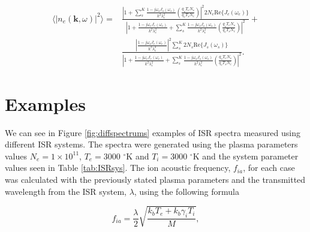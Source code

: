 \begin{equation}
\label{eq:sumspeceqactual}
\begin{split}
\displaystyle \langle \left|n_e(\mathbf{k},\omega)\right|^2\rangle =&  \frac{\left|1 + \sum_s^K  \frac{1-j\omega_s J_s(\omega_s)}{k^2\lambda_e^2} \left(\frac{q_sT_eN_s}{q_eT_sN_e}\right) \right|^2 2N_e\text{Re}\{J_e(\omega_e)\}}{\left|1 + \frac{1-j\omega_e J_e(\omega_e)}{k^2\lambda_e^2}  +\sum_s^K  \frac{1-j\omega_s J_s(\omega_s)}{k^2\lambda_e^2} \left(\frac{q_sT_eN_s}{q_eT_sN_e}\right) \right|^2}       + \\        & \frac{\left| \frac{1-j\omega_s J_e(\omega_e)}{k^2\lambda_e^2} \right|^2\sum_s^K  2N_s\text{Re}\{J_s(\omega_s)\}}{\left|1 + \frac{1-j\omega_e J_e(\omega_e)}{k^2\lambda_e^2}  +\sum_s^K  \frac{1-j\omega_s J_s(\omega_s)}{k^2\lambda_e^2} \left(\frac{q_sT_eN_s}{q_eT_sN_e}\right) \right|^2}.
\end{split}
\end{equation}

\section{Examples}
We can see in Figure \ref{fig:diffspectrums} examples of ISR spectra measured using different ISR systems. The spectra were generated using the plasma parameters values $N_e=1\times10^{11}$, $T_e=$3000 $^\circ$K and $T_i=$3000 $^\circ$K and the system parameter values seen in Table \ref{tab:ISRsys}. The ion acoustic frequency, $f_{ia}$, for each case was calculated with the previously stated plasma parameters  and the transmitted wavelength from the ISR system, $\lambda$, using the following formula

\begin{equation}
\label{eq:iaf}
f_{ia} = \frac{\lambda}{2}\sqrt{\frac{k_bT_e +k_b\gamma_iT_i}{M}},
\end{equation}

